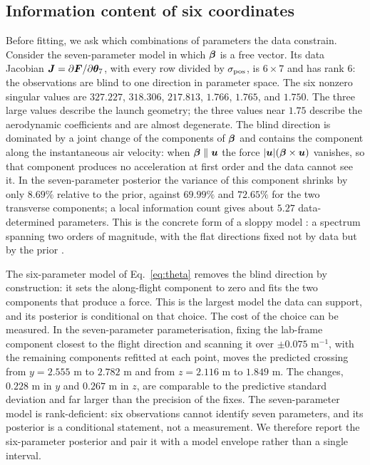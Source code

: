 \subsection{Information content of six coordinates}
\label{sec:audit}

Before fitting, we ask which combinations of parameters the data constrain.
Consider the seven-parameter model in which $\bm{\beta}$ is a free vector. Its
data Jacobian $\bm{J}=\partial\bm{F}/\partial\bm{\theta}_7$, with every row
divided by $\sigma_{\rm pos}$, is $6\times7$ and has rank $6$: the observations
are blind to one direction in parameter space. The six nonzero singular values
are $327.227$, $318.306$, $217.813$, $1.766$, $1.765$, and $1.750$. The three
large values describe the launch geometry; the three values near $1.75$ describe
the aerodynamic coefficients and are almost degenerate. The blind direction is
dominated by a joint change of the components of $\bm{\beta}$ and contains the
component along the instantaneous air velocity: when $\bm{\beta}\parallel\bm{u}$
the force $|\bm{u}|(\bm{\beta}\times\bm{u})$ vanishes, so that component
produces no acceleration at first order and the data cannot see it. In the
seven-parameter posterior the variance of this component shrinks by only
$8.69\%$ relative to the prior, against $69.99\%$ and $72.65\%$ for the two
transverse components; a local information count gives about $5.27$
data-determined parameters. This is the concrete form of a sloppy model
\citep{gutenkunst2007}: a spectrum spanning two orders of magnitude, with the
flat directions fixed not by data but by the prior \citep{white2017}.

The six-parameter model of Eq.~\eqref{eq:theta} removes the blind direction by
construction: it sets the along-flight component to zero and fits the two
components that produce a force. This is the largest model the data can support,
and its posterior is conditional on that choice. The cost of the choice can be
measured. In the seven-parameter parameterisation, fixing the lab-frame
component closest to the flight direction and scanning it over $\pm0.075$
m$^{-1}$, with the remaining components refitted at each point, moves the
predicted crossing from $y=2.555$ m to $2.782$ m and from $z=2.116$ m to
$1.849$ m. The changes, $0.228$ m in $y$ and $0.267$ m in $z$, are comparable to
the predictive standard deviation and far larger than the precision of the
fixes. The seven-parameter model is rank-deficient: six observations cannot
identify seven parameters, and its posterior is a conditional statement, not a
measurement. We therefore report the six-parameter posterior and pair it with a
model envelope rather than a single interval.

